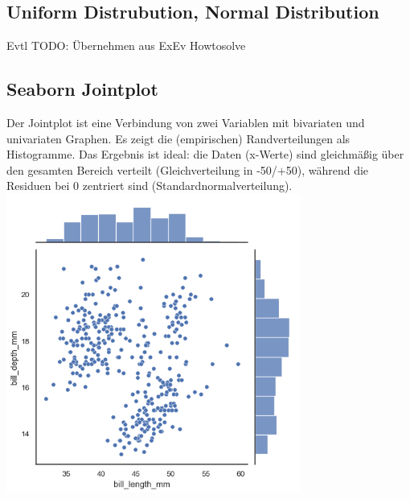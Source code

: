 \subsection{Uniform Distrubution, Normal Distribution}
Evtl TODO: Übernehmen aus ExEv Howtosolve
\subsection{Seaborn Jointplot}
Der Jointplot ist eine Verbindung von zwei Variablen mit bivariaten und univariaten Graphen. Es zeigt die (empirischen) Randverteilungen als Histogramme. Das Ergebnis ist ideal: die Daten (x-Werte) sind gleichmäßig über den gesamten Bereich verteilt (Gleichverteilung in -50/+50), während die Residuen bei 0 zentriert sind (Standardnormalverteilung).
\includegraphics[width=\linewidth]{img/seaborn_jointplot.png}